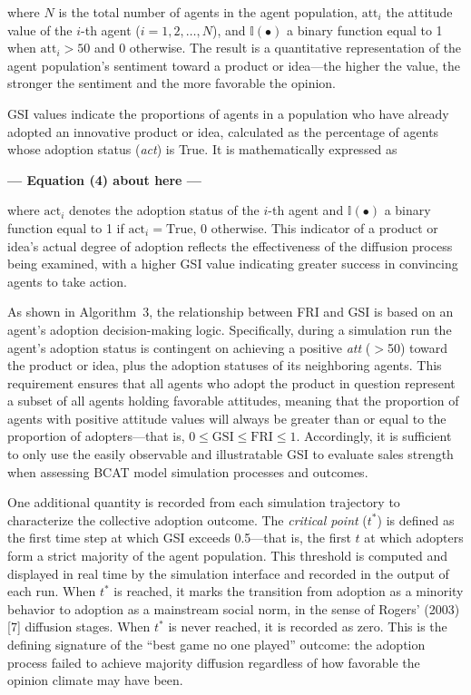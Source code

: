\documentclass[10pt,letterpaper]{article}
\begin{document}
\noindent where $N$ is the total number of agents in the agent population, $\text{att}_{i}$ the attitude value of the $i$-th agent ($i = 1, 2, \ldots, N$), and $\mathbb{I}(\bullet)$ a binary function equal to 1 when $\text{att}_{i} > 50$ and 0 otherwise. The result is a quantitative representation of the agent population's sentiment toward a product or idea---the higher the value, the stronger the sentiment and the more favorable the opinion.

GSI values indicate the proportions of agents in a population who have already adopted an innovative product or idea, calculated as the percentage of agents whose adoption status (\textit{act}) is True. It is mathematically expressed as


\begin{center}\textbf{--- Equation (4) about here ---}\end{center}


\noindent where $\text{act}_{i}$ denotes the adoption status of the $i$-th agent and $\mathbb{I}(\bullet)$ a binary function equal to 1 if $\text{act}_{i} = \text{True}$, 0 otherwise. This indicator of a product or idea's actual degree of adoption reflects the effectiveness of the diffusion process being examined, with a higher GSI value indicating greater success in convincing agents to take action.

As shown in Algorithm~3, the relationship between FRI and GSI is based on an agent's adoption decision-making logic. Specifically, during a simulation run the agent's adoption status is contingent on achieving a positive \textit{att} ($>$50) toward the product or idea, plus the adoption statuses of its neighboring agents. This requirement ensures that all agents who adopt the product in question represent a subset of all agents holding favorable attitudes, meaning that the proportion of agents with positive attitude values will always be greater than or equal to the proportion of adopters---that is, $0 \leq \text{GSI} \leq \text{FRI} \leq 1$. Accordingly, it is sufficient to only use the easily observable and illustratable GSI to evaluate sales strength when assessing BCAT model simulation processes and outcomes.

One additional quantity is recorded from each simulation trajectory to characterize the collective adoption outcome. The \textit{critical point} ($t^{*}$) is defined as the first time step at which GSI exceeds 0.5---that is, the first $t$ at which adopters form a strict majority of the agent population. This threshold is computed and displayed in real time by the simulation interface and recorded in the output of each run. When $t^{*}$ is reached, it marks the transition from adoption as a minority behavior to adoption as a mainstream social norm, in the sense of Rogers' (2003) [7] diffusion stages. When $t^{*}$ is never reached, it is recorded as zero. This is the defining signature of the ``best game no one played'' outcome: the adoption process failed to achieve majority diffusion regardless of how favorable the opinion climate may have been.
\end{document}
